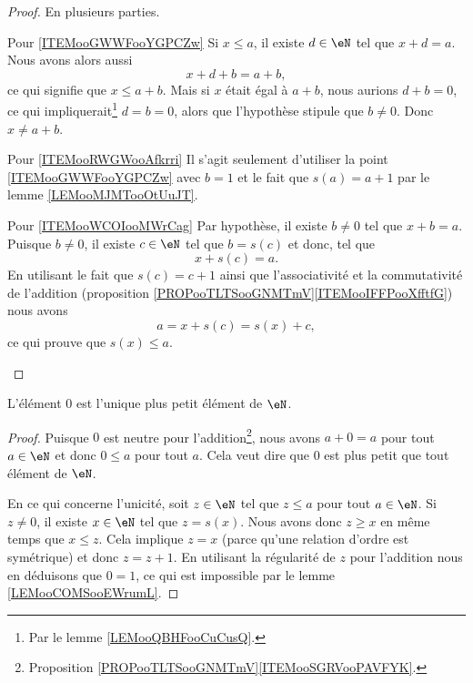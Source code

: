 \begin{proof}
	En plusieurs parties.
	\begin{subproof}
		\item[Pour \ref{ITEMooGWWFooYGPCZw}]
		Si \( x\leq a\), il existe \( d\in \eN\) tel que \( x+d=a\). Nous avons alors aussi
		\begin{equation}
			x+d+b=a+b,
		\end{equation}
		ce qui signifie que \( x\leq a+b\). Mais si \( x\) était égal à \( a+b\), nous aurions \( d+b=0\), ce qui impliquerait\footnote{Par le lemme \ref{LEMooQBHFooCuCusQ}.} \( d=b=0\), alors que l'hypothèse stipule que \( b\neq 0\). Donc \( x\neq a+b\).
		\item[Pour \ref{ITEMooRWGWooAfkrri}]
		Il s'agit seulement d'utiliser la point \ref{ITEMooGWWFooYGPCZw} avec \( b=1\) et le fait que \( s(a)=a+1\) par le lemme \ref{LEMooMJMTooOtUuJT}.
		\item[Pour \ref{ITEMooWCOIooMWrCag}]
		Par hypothèse, il existe \( b\neq 0\) tel que \( x+b=a\). Puisque \( b\neq 0\), il existe \( c\in \eN\) tel que \( b=s(c)\) et donc, tel que
		\begin{equation}
			x+s(c)=a.
		\end{equation}
		En utilisant le fait que \( s(c)=c+1\) ainsi que l'associativité et la commutativité de l'addition (proposition \ref{PROPooTLTSooGNMTmV}\ref{ITEMooIFFPooXfftfG}) nous avons
		\begin{equation}
			a=x+s(c)=s(x)+c,
		\end{equation}
		ce qui prouve que \( s(x)\leq a\).
	\end{subproof}
\end{proof}

\begin{lemma}       \label{LEMooCSIXooHeuWEd}
	L'élément \( 0\) est l'unique plus petit élément de \( \eN\).
\end{lemma}

\begin{proof}
	Puisque \( 0\) est neutre pour l'addition\footnote{Proposition \ref{PROPooTLTSooGNMTmV}\ref{ITEMooSGRVooPAVFYK}.}, nous avons \( a+0=a\) pour tout \( a\in \eN\) et donc \( 0\leq a\) pour tout \( a\). Cela veut dire que \( 0\) est plus petit que tout élément de \( \eN\).

	En ce qui concerne l'unicité, soit \( z\in \eN\) tel que \( z\leq a\) pour tout \( a\in \eN\). Si \( z\neq 0\), il existe \( x\in \eN\) tel que \( z=s(x)\). Nous avons donc \( z\geq x\) en même temps que \(x\leq z\). Cela implique \( z=x\) (parce qu'une relation d'ordre est symétrique) et donc \( z=z+1\). En utilisant la régularité de \( z\) pour l'addition nous en déduisons que \( 0=1\), ce qui est impossible par le lemme \ref{LEMooCOMSooEWrumL}.
\end{proof}

